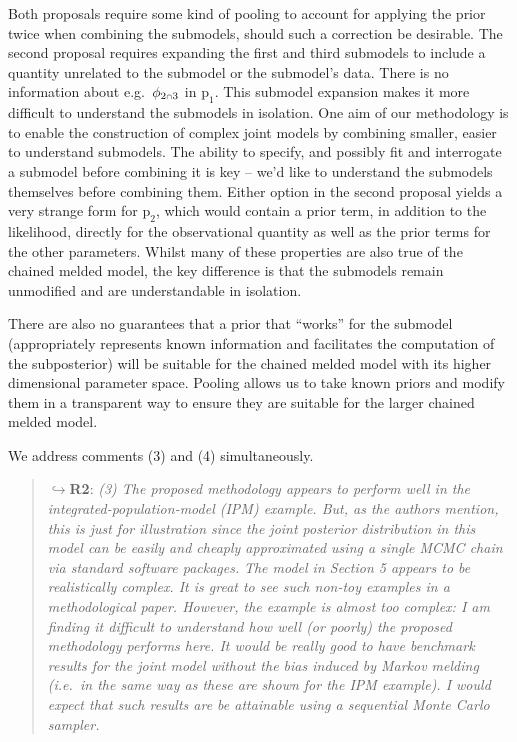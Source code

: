 \documentclass[
  10pt,
  a4paper,
]{article}
\let\Oldcap\cap
\renewcommand{\cap}{\mathrel{\mathsmaller{\Oldcap}}}
\newcommand{\pd}{\text{p}}
\begin{document}
Both proposals require some kind of pooling to account for applying the
prior twice when combining the submodels, should such a correction be
desirable. The second proposal requires expanding the first and third
submodels to include a quantity unrelated to the submodel or the
submodel's data. There is no information about e.g.~\(\phi_{2 \cap 3}\)
in \(\pd_{1}\). This submodel expansion makes it more difficult to
understand the submodels in isolation. One aim of our methodology is to
enable the construction of complex joint models by combining smaller,
easier to understand submodels. The ability to specify, and possibly fit
and interrogate a submodel before combining it is key -- we'd like to
understand the submodels themselves before combining them. Either option
in the second proposal yields a very strange form for \(\pd_{2}\), which
would contain a prior term, in addition to the likelihood, directly for
the observational quantity as well as the prior terms for the other
parameters. Whilst many of these properties are also true of the chained
melded model, the key difference is that the submodels remain unmodified
and are understandable in isolation.

There are also no guarantees that a prior that ``works'' for the
submodel (appropriately represents known information and facilitates the
computation of the subposterior) will be suitable for the chained melded
model with its higher dimensional parameter space. Pooling allows us to
take known priors and modify them in a transparent way to ensure they
are suitable for the larger chained melded model.

\par

\noindent\hrulefill

\par

We address comments (3) and (4) simultaneously.

\begin{quote}
\(\hookrightarrow\)\textbf{R2}: \emph{(3) The proposed methodology
appears to perform well in the integrated-population-model (IPM)
example. But, as the authors mention, this is just for illustration
since the joint posterior distribution in this model can be easily and
cheaply approximated using a single MCMC chain via standard software
packages.} \emph{The model in Section 5 appears to be realistically
complex. It is great to see such non-toy examples in a methodological
paper. However, the example is almost too complex: I am finding it
difficult to understand how well (or poorly) the proposed methodology
performs here. It would be really good to have benchmark results for the
joint model without the bias induced by Markov melding (i.e.~in the same
way as these are shown for the IPM example). I would expect that such
results are be attainable using a sequential Monte Carlo sampler.}
\end{quote}
\end{document}
